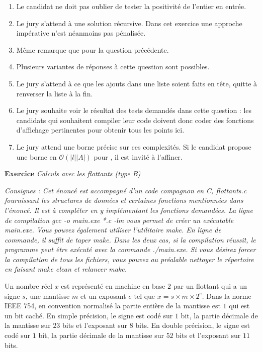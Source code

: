 \documentclass[a4paper, 11pt]{article}
\newcounter{exocntr}
\newcommand{\exocommand}[1]{\stepcounter{exocntr} \textbf{Exercice \arabic{exocntr}} \textit{#1}}
\begin{document}
\begin{enumerate}
\item Le candidat ne doit pas oublier de tester la positivité de l'entier en entrée.
\item Le jury s'attend à une solution récursive. Dans cet exercice une approche impérative n'est néanmoins pas pénalisée.
\item Même remarque que pour la question précédente.
\item Plusieurs variantes de réponses à cette question sont possibles.
\item Le jury s'attend à ce que les ajouts dans une liste soient faits en tête, quitte à renverser la liste à la fin.
\item Le jury souhaite voir le résultat des tests demandés dans cette question : les candidats qui souhaitent compiler leur code doivent donc coder des fonctions d'affichage pertinentes pour obtenir tous les points ici.
\item Le jury attend une borne précise sur ces complexités. Si le
  candidat propose une borne en $\mathcal{O}(|l||A|)$ pour
  , il est invité à l'affiner.
\end{enumerate}

\newpage

\exocommand{Calculs avec les flottants (type B)}

\textit{Consignes : Cet énoncé est accompagné d'un code compagnon en C, \textsf{flottants.c} fournissant les structures de données et certaines fonctions mentionnées dans l'énoncé. Il est à compléter en y implémentant les fonctions demandées. La ligne de compilation \textsf{gcc -o main.exe *.c -lm} vous permet de créer un exécutable \textsf{main.exe}. Vous pouvez également utiliser l'utilitaire \textsf{make}. En ligne de commande, il suffit de taper \textsf{make}. Dans les deux cas, si
la compilation réussit, le programme peut être exécuté avec la commande \textsf{./main.exe}. Si vous désirez forcer la compilation
de tous les fichiers, vous pouvez au préalable nettoyer le répertoire en faisant \textsf{make clean} et relancer \textsf{make}.}

Un nombre réel $x$ est représenté en machine en base $2$ par un flottant qui a un signe $s$, une mantisse $m$ et un exposant $e$ tel que $x=s\times m \times 2^e$. Dans la norme IEEE 754, en convention normalisé la partie entière de la mantisse est $1$ qui est un bit caché. En simple précision, le signe est codé sur $1$ bit, la partie décimale de la mantisse sur $23$ bits et l'exposant sur $8$ bits. En double précision, le signe est codé sur $1$ bit, la partie décimale de la mantisse sur $52$ bits  et l'exposant sur $11$ bits.
\end{document}
